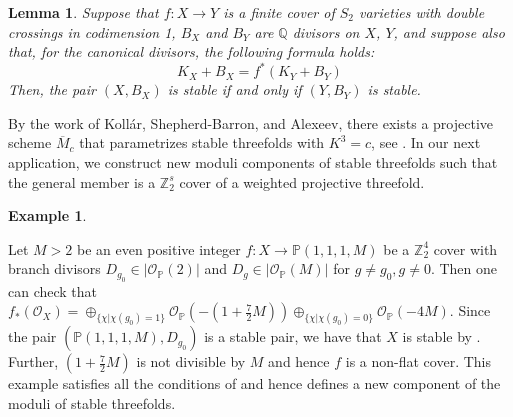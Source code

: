 \documentclass[12pt,twoside,]{amsart}
\theoremstyle{plain}
\newtheorem{lemma}[theorem]{Lemma}
\theoremstyle{definition}
\newtheorem{example}[theorem]{Example}
\begin{document}
\begin{lemma}\label{cover is stable}
Suppose that $f: X \to Y$ is a finite cover of $S_2$ varieties with double crossings in codimension 1, $B_X$ and $B_Y$ are $\mathbb{Q}$ divisors on $X$,
 $Y$, and suppose also that, for the canonical divisors, the following formula holds:
 \[
 K_X + B_X = f^*\left( K_Y + B_Y\right)
 \]
 Then, the pair $(X,B_X)$ is stable if and only if $(Y, B_Y)$ is stable.
\end{lemma}
By the work of Koll\'ar, Shepherd-Barron,  and Alexeev, there exists a projective scheme $\overline{M}_c$ that parametrizes stable threefolds with $K^3=c$, see \cite{kollar2023families}. In our next application, we construct new moduli components of stable threefolds such that the general member is a $\mathbb{Z}_2^s$ cover of a weighted projective threefold.









\begin{example}\label{new components}

Let $M > 2$ be an even positive integer $f: X \to \mathbb{P}(1,1,1,M)$ be a $\mathbb{Z}_2^4$ cover with branch divisors $D_{g_0} \in |\mathcal{O}_{\mathbb{P}}(2)|$ and $D_{g} \in |\mathcal{O}_{\mathbb{P}}(M)|$ for $g \neq g_0, g \neq 0$. Then one can check that $f_*(\mathcal{O}_X) = \oplus_{\{\chi | \chi(g_0) = 1\}} \mathcal{O}_{\mathbb{P}}(-(1+\frac{7}{2}M)) \oplus_{\{\chi | \chi(g_0) = 0\}} \mathcal{O}_{\mathbb{P}}(-4M)$. Since the pair $(\mathbb{P}(1,1,1,M), D_{g_0})$ is a stable pair, we have that $X$ is stable by . Further, $(1+\frac{7}{2}M)$ is not divisible by $M$ and hence $f$ is a non-flat cover. This example satisfies all the conditions of  and hence defines a new component of the moduli of stable threefolds.
    
\end{example}
\end{document}
